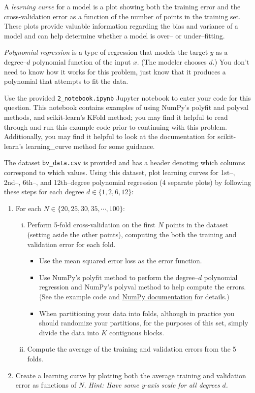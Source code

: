 A \emph{learning curve} for a model is a plot showing both the training error and the cross-validation error as a function of the number of points in the training set. These plots provide valuable information regarding the bias and variance of a model and can help determine whether a model is over-- or under--fitting.

\emph{Polynomial regression} is a type of regression that models the target $y$ as a degree--$d$ polynomial function of the input $x$. (The modeler chooses $d$.)  You don't need to know how it works for this problem, just know that it produces a polynomial that attempts to fit the data.

\begin{problem}[14]
    Use the provided \texttt{2_notebook.ipynb} Jupyter notebook to enter your code for this question. This notebook contains examples of using NumPy's polyfit and polyval methods, and scikit-learn's KFold method; you may find it helpful to read through and run this example code prior to continuing with this problem. Additionally, you may find it helpful to look at the documentation for scikit-learn's learning_curve method for some guidance.

The dataset \texttt{bv_data.csv} is provided and has a header denoting which columns correspond to which values. Using this dataset, plot learning curves for 1st--, 2nd--, 6th--, and 12th--degree polynomial regression (4 separate plots) by following these steps for each degree $d \in \{1, 2, 6, 12\}$:

  \begin{enumerate}
    \item For each $N \in \{20, 25, 30, 35, \cdots, 100\}$:
    \begin{enumerate}[i.]
      \item Perform 5-fold cross-validation on the first $N$ points in the dataset (setting aside the other points), computing the both the training and validation error for each fold. 
      \begin{itemize}
        \item Use the mean squared error loss as the error function.
        \item Use NumPy's polyfit method to perform the degree--$d$ polynomial regression and NumPy's polyval method to help compute the errors.  (See the example code and \href{https://docs.scipy.org/doc/NumPy/reference/routines.polynomials.poly1d.html}{NumPy documentation} for details.)
        \item When partitioning your data into folds, although in practice you should randomize your partitions, for the purposes of this set, simply divide the data into $K$ contiguous blocks.
      \end{itemize}
      \item Compute the average of the training and validation errors from the 5 folds.
    \end{enumerate}
    \item Create a learning curve by plotting both the average training and validation error as functions of $N$. \textit{Hint: Have same y-axis scale for all degrees $d$.}
  \end{enumerate}


\end{problem}
